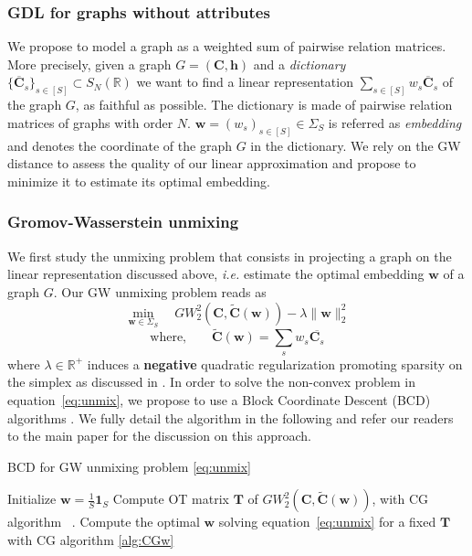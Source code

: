 \documentclass{article}
\def\eqref#1{equation~\ref{#1}}
\def\vh{{\bm{h}}}
\def\vw{{\bm{w}}}
\def\mC{{\bm{C}}}
\def\mT{{\bm{T}}}
\newcommand{\R}{\mathbb{R}}
\def\R{{\mathbb{R}}}
\begin{document}
	\subsubsection{GDL for graphs without attributes} 
	We propose to model a graph as a weighted sum of pairwise relation
	matrices. More precisely, given a graph $G=(\mC,\vh)$ and a \emph{dictionary}
	$\{\overline{\mC}_{s}\}_{s \in [S]} \subset S_N(\R)$  we want to find a linear representation $\sum_{s
		\in [S]} w_{s} \overline{\mC}_{s}$ of the graph $G$, as faithful as
	possible. The dictionary is made of pairwise relation matrices of graphs with
	order $N$. $\vw=(w_{s})_{s \in [S]} \in \Sigma_S$ is referred as
	\emph{embedding} and denotes the coordinate of the graph $G$ in the dictionary. We rely
	on the GW distance to assess the quality of our linear
	approximation and propose to minimize it to estimate its optimal embedding. 
	
	
	\subsubsection{Gromov-Wasserstein unmixing}
	We first study the unmixing problem that consists in projecting a graph on the
	linear representation discussed above, \emph{i.e.} estimate the optimal
	embedding $\vw$ of a graph $G$. Our GW unmixing problem reads as 
	\begin{equation}   
	\min_{\vw \in \Sigma_S}\quad GW^2_2\left(\mC, \widetilde{\mC}(\vw)\right) - \lambda \|\vw\|^2_2 \label{eq:unmix}
	\end{equation}
	\begin{equation}
	\text{where,} \qquad \widetilde{\mC}(\vw) = \sum_s w_s \overline{\mC_s}
	\end{equation}
	where $\lambda \in \mathbb{R}^{+}$ induces a \textbf{negative} quadratic regularization promoting sparsity on the
	simplex as discussed in \citet{li2016methods}. In order to solve the non-convex problem in \eqref{eq:unmix}, we propose to
	use a Block Coordinate Descent (BCD) algorithms \citep{tseng2001convergence}. We fully detail the algorithm in the following and refer our readers to the main paper for the discussion on this approach.
	\begin{algorithm}[H]
		\caption{BCD for GW unmixing problem \ref{eq:unmix}}
		\label{alg:BCD1}
		\begin{algorithmic}[1]
			\STATE Initialize $\vw=\frac{1}{S}\mathbf{1}_S$
			\REPEAT
			\STATE Compute OT matrix $\mT$ of $GW_2^2\left(\mC, \widetilde{\mC}(\vw) \right)$, with CG algorithm ~\citep[Alg.1 \& 2]{vayer-fused-2018}.
			\STATE Compute the optimal $\vw$ solving \eqref{eq:unmix} for a fixed
			$\mT$ with CG algorithm \ref{alg:CGw}
		\end{algorithmic}
	\end{algorithm}
	
\end{document}
